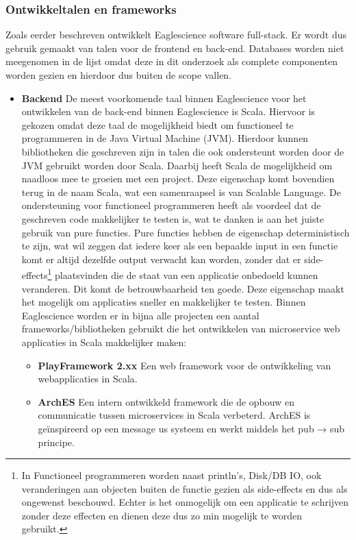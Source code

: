 \subsubsection{Ontwikkeltalen en frameworks}\label{subsubsec:ontwikkeltalen-en-frameworks}
Zoals eerder beschreven ontwikkelt Eaglescience software full-stack. Er wordt dus gebruik gemaakt van talen voor de frontend en back-end. Databases worden niet meegenomen in de lijst omdat deze in dit onderzoek als complete componenten worden gezien en hierdoor dus buiten de scope vallen.
\begin{itemize}
    \item \textbf{Backend} De meest voorkomende taal binnen Eaglescience voor het ontwikkelen van de back-end binnen Eaglescience is Scala. Hiervoor is gekozen omdat deze taal de mogelijkheid biedt om functioneel te programmeren in de Java Virtual Machine (JVM). Hierdoor kunnen bibliotheken die geschreven zijn in talen die ook ondersteunt worden door de JVM gebruikt worden door Scala. Daarbij heeft Scala de mogelijkheid om naadloos mee te groeien met een project. Deze eigenschap komt bovendien terug in de naam Scala, wat een samenraapsel is van Scalable Language. De ondersteuning voor functioneel programmeren heeft als voordeel dat de geschreven code makkelijker te testen is, wat te danken is aan het juiste gebruik van pure functies. Pure functies hebben de eigenschap deterministisch te zijn, wat wil zeggen dat iedere keer als een bepaalde input in een functie komt er altijd dezelfde output verwacht kan worden, zonder dat er side-effects\footnote{In Functioneel programmeren worden naast println's, Disk/DB IO, ook veranderingen aan objecten buiten de functie gezien als side-effects en dus als ongewenst beschouwd. Echter is het onmogelijk om een applicatie te schrijven zonder deze effecten en dienen deze dus zo min mogelijk te worden gebruikt.} plaatsvinden die de staat van een applicatie onbedoeld kunnen veranderen. Dit komt de betrouwbaarheid ten goede. Deze eigenschap maakt het mogelijk om applicaties sneller en makkelijker te testen. Binnen Eaglescience worden er in bijna alle projecten een aantal frameworks/bibliotheken gebruikt die het ontwikkelen van microservice web applicaties in Scala makkelijker maken:
    \begin{itemize}
        \item \textbf{PlayFramework 2.xx} Een web framework voor de ontwikkeling van webapplicaties in Scala.
        \item \textbf{ArchES} Een intern ontwikkeld framework die de opbouw en communicatie tussen microservices in Scala verbeterd. ArchES is geïnspireerd op een message us systeem en werkt middels het pub → sub principe.

\end{itemize}
\end{itemize}
